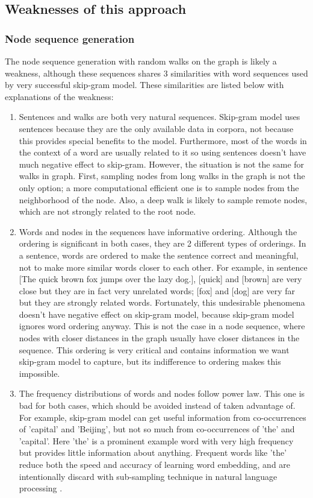 \documentclass{article}
\begin{document}
\subsection{Weaknesses of this approach}

\subsubsection{Node sequence generation}
The node sequence generation with random walks on the graph is likely a weakness, although these sequences shares 3 similarities with word sequences used by very successful skip-gram model. These similarities are listed below with explanations of the weakness:
\begin{enumerate}
	\item Sentences and walks are both very natural sequences. Skip-gram model uses sentences because they are the only available data in corpora, not because this provides special benefits to the model. Furthermore, most of the words in the context of a word are usually related to it so using sentences doesn't have much negative effect to skip-gram. However, the situation is not the same for walks in graph. First, sampling nodes from long walks in the graph is not the only option; a more computational efficient one is to sample nodes from the neighborhood of the node. Also, a deep walk is likely to sample remote nodes, which are not strongly related to the root node.
	\item Words and nodes in the sequences have informative ordering. Although the ordering is significant in both cases, they are 2 different types of orderings. In a sentence, words are ordered to make the sentence correct and meaningful, not to make more similar words closer to each other. For example, in sentence [The quick brown fox jumps over the lazy dog.], [quick] and [brown] are very close but they are in fact very unrelated words; [fox] and [dog] are very far but they are strongly related words. Fortunately, this undesirable phenomena doesn't have negative effect on skip-gram model, because skip-gram model ignores word ordering anyway. This is not the case in a node sequence, where nodes with closer distances in the graph usually have closer distances in the sequence. This ordering is very critical and contains information we want skip-gram model to capture, but its indifference to ordering makes this impossible.
	\item The frequency distributions of words and nodes follow power law. This one is bad for both cases, which should be avoided instead of taken advantage of. For example, skip-gram model can get useful information from co-occurrences of 'capital' and 'Beijing', but not so much from co-occurrences of 'the' and 'capital'. Here 'the' is a prominent example word with very high frequency but provides little information about anything. Frequent words like 'the' reduce both the speed and accuracy of learning word embedding, and are intentionally discard with sub-sampling technique in natural language processing \cite{mikolov2013distributed}.
\end{enumerate}
\end{document}
